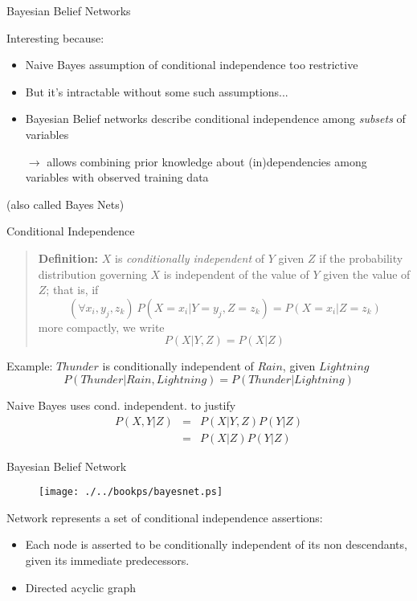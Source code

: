 \documentclass[%
pdf,
colorBG,
slideColor,
tcrico,
]{prosper}
\begin{document}

\begin{slide}{Bayesian Belief Networks   }  

Interesting because:
\begin{itemize}
\item Naive Bayes assumption of conditional independence too restrictive
\item But it's intractable without some such assumptions...
\item Bayesian Belief networks describe conditional independence among {\em
subsets} of variables
\item[$\to$] allows combining prior knowledge about (in)dependencies among
variables with observed training data
\end{itemize}
\bigskip
(also called Bayes Nets)
\end{slide}



\begin{slide}{Conditional Independence   }  
\tiny
\begin{quote}
{\bf Definition:} $X$ is {\em conditionally independent} of $Y$ given $Z$ if
the probability distribution governing $X$ is independent of the value of $Y$
given the value of $Z$; that is, if
\[  (\forall x_i,y_j,z_k) \ P(X = x_i | Y = y_j, Z = z_k) =   P(X = x_i | Z
= z_k) \]
more compactly, we write
\[  P(X | Y,Z) = P(X | Z) \]
\end{quote}

Example: $Thunder$ is conditionally independent of $Rain$, given $Lightning$
\[  P(Thunder | Rain, Lightning) = P(Thunder | Lightning) \]

Naive Bayes uses cond. independent. to justify
\begin{eqnarray}
P(X,Y|Z) &= &P(X|Y,Z) P(Y|Z)  \nonumber \\
 &= &P(X|Z) P(Y|Z)  \nonumber
\end{eqnarray}
\end{slide}


\begin{slide}{Bayesian Belief Network   }  
\tiny
\begin{figure}
	\centering
	\texttt{[image: ./../bookps/bayesnet.ps]}
\end{figure}

Network represents a set of conditional independence assertions:

\begin{itemize}
\item Each node is asserted to be conditionally independent of its non descendants, given its
immediate predecessors.
\item Directed acyclic graph
\end{itemize}
\end{slide}
\end{document}
